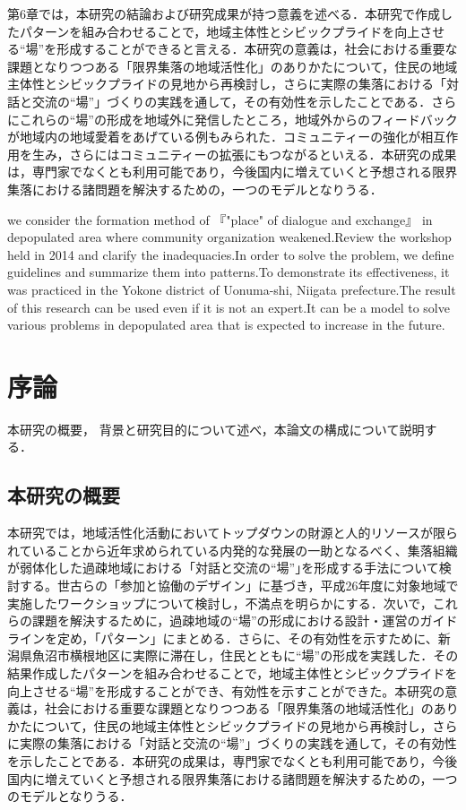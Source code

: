 \documentclass[a4paper]{jsarticle}
\begin{document}
 第6章では，本研究の結論および研究成果が持つ意義を述べる．本研究で作成したパターンを組み合わせることで，地域主体性とシビックプライドを向上させる“場”を形成することができると言える．本研究の意義は，社会における重要な課題となりつつある「限界集落の地域活性化」のありかたについて，住民の地域主体性とシビックプライドの見地から再検討し，さらに実際の集落における「対話と交流の“場”」づくりの実践を通して，その有効性を示したことである．さらにこれらの“場”の形成を地域外に発信したところ，地域外からのフィードバックが地域内の地域愛着をあげている例もみられた．コミュニティーの強化が相互作用を生み，さらにはコミュニティーの拡張にもつながるといえる．本研究の成果は，専門家でなくとも利用可能であり，今後国内に増えていくと予想される限界集落における諸問題を解決するための，一つのモデルとなりうる．





we consider the formation method of 『"place" of dialogue and exchange』 in depopulated area where community organization weakened.Review the workshop held in 2014 and clarify the inadequacies.In order to solve the problem, we define guidelines and summarize them into patterns.To demonstrate its effectiveness, it was practiced in the Yokone district of Uonuma-shi, Niigata prefecture.The result of this research can be used even if it is not an expert.It can be a model to solve various problems in depopulated area that is expected to increase in the future.
\makemokuji


\newpage

\setcounter{page}{1} %
\section{序論}
本研究の概要， 背景と研究目的について述べ，本論文の構成について説明する．
\subsection{本研究の概要}
本研究では，地域活性化活動においてトップダウンの財源と人的リソースが限られていることから近年求められている内発的な発展の一助となるべく、集落組織が弱体化した過疎地域における「対話と交流の“場”｣を形成する手法について検討する。世古らの「参加と協働のデザイン」に基づき，平成26年度に対象地域で実施したワークショップについて検討し，不満点を明らかにする．次いで，これらの課題を解決するために，過疎地域の“場”の形成における設計・運営のガイドラインを定め，「パターン」にまとめる．さらに、その有効性を示すために、新潟県魚沼市横根地区に実際に滞在し，住民とともに“場”の形成を実践した．その結果作成したパターンを組み合わせることで，地域主体性とシビックプライドを向上させる“場”を形成することができ、有効性を示すことができた。本研究の意義は，社会における重要な課題となりつつある「限界集落の地域活性化」のありかたについて，住民の地域主体性とシビックプライドの見地から再検討し，さらに実際の集落における「対話と交流の“場”」づくりの実践を通して，その有効性を示したことである．本研究の成果は，専門家でなくとも利用可能であり，今後国内に増えていくと予想される限界集落における諸問題を解決するための，一つのモデルとなりうる．
\end{document}
